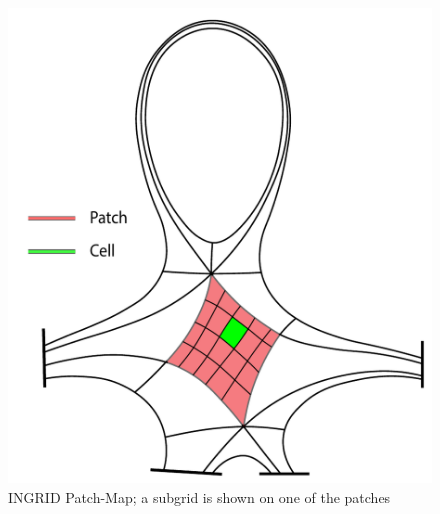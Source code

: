





\begin{figure}[H]
    \centering
    \includegraphics[width=0.5\linewidth]{figures/geometry_render.pdf}  %
    \caption{INGRID Patch-Map; a subgrid is shown on one of the patches}
    \label{fig:patchmap_subgrid}
\end{figure}

